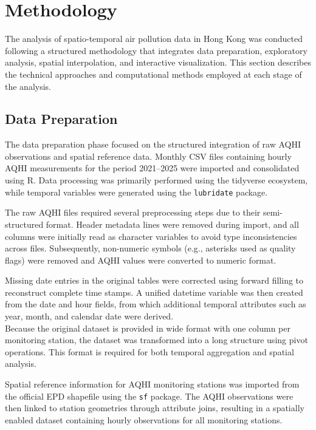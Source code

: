 \documentclass[manuscript,nonacm]{acmart}
\begin{document}
\section{Methodology}
    The analysis of spatio-temporal air pollution data in Hong Kong was conducted following a structured methodology that integrates data preparation, exploratory analysis, spatial interpolation, and interactive visualization. This section describes the technical approaches and computational methods employed at each stage of the analysis.

    \subsection{Data Preparation}
    
        The data preparation phase focused on the structured integration of raw AQHI observations and spatial reference data. Monthly CSV files containing hourly AQHI measurements for the period 2021–2025 were imported and consolidated using R. Data processing was primarily performed using the tidyverse ecosystem, while temporal variables were generated using the \texttt{lubridate} package.

        The raw AQHI files required several preprocessing steps due to their semi-structured format. Header metadata lines were removed during import, and all columns were initially read as character variables to avoid type inconsistencies across files. Subsequently, non-numeric symbols (e.g., asterisks used as quality flags) were removed and AQHI values were converted to numeric format.

        Missing date entries in the original tables were corrected using forward filling to reconstruct complete time stamps. A unified datetime variable was then created from the date and hour fields, from which additional temporal attributes such as year, month, and calendar date were derived.\\
        Because the original dataset is provided in wide format with one column per monitoring station, the dataset was transformed into a long structure using pivot operations. This format is required for both temporal aggregation and spatial analysis.

        Spatial reference information for AQHI monitoring stations was imported from the official EPD shapefile using the \texttt{sf} package. The AQHI observations were then linked to station geometries through attribute joins, resulting in a spatially enabled dataset containing hourly observations for all monitoring stations.
\end{document}
